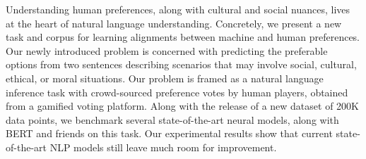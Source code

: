 Understanding human preferences, along with cultural and social nuances, lives at the heart of natural language understanding. Concretely, we present a new task and corpus for learning alignments between machine and human preferences. Our newly introduced problem is concerned with predicting the preferable options from two sentences describing scenarios that may involve social, cultural, ethical, or moral situations. Our problem is framed as a natural language inference task with crowd-sourced preference votes by human players, obtained from a gamified voting platform. Along with the release of a new dataset of 200K data points, we benchmark several state-of-the-art neural models, along with BERT and friends on this task. Our experimental results show that current state-of-the-art NLP models still leave much room for improvement.

